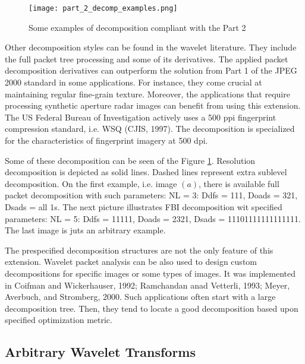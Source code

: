 \begin{figure}
    \centering
    \texttt{[image: part\_2\_decomp\_examples.png]}
    \caption{Some examples of decomposition compliant with the Part 2 \cite{jpeg_suite}}
    \label{fig:part_2_decomp_examples}
\end{figure}

Other decomposition styles can be found in the wavelet literature. They include the full packet
tree processing and some of its derivatives. The applied packet decomposition derivatives
can outperform the solution from Part 1 of the JPEG 2000 standard in some applications.
For instance, they come crucial at maintaining regular fine-grain texture. Moreover,
the applications that require processing synthetic aperture radar images can benefit
from using this extension. The US Federal Bureau of Investigation actively uses a 500 ppi
fingerprint compression standard, i.e. WSQ (CJIS, 1997). The decomposition is specialized
for the characteristics of fingerprint imagery at 500 dpi. \cite{jpeg_suite}

Some of these decomposition can be seen of the Figure \ref{fig:part_2_decomp_examples}.
Resolution decomposition is depicted as solid lines. Dashed lines represent extra sublevel
decomposition. On the first example, i.e. image $(a)$, there is available full packet decomposition
with such parameters: NL = 3: Ddfs = 111, Doads = 321, Dsads = all 1s. The next picture
illustrates FBI decomposition wit specified parameters: NL = 5: Ddfs = 11111, Doads = 2321,
Dsads = 11101111111111111. The last image is juts an arbitrary example. \cite{jpeg_suite}

The prespecified decomposition structures are not the only feature of this extension.
Wavelet packet analysis can be also used to design custom decompositions for specific images
or some types of images. It was implemented in Coifman and Wickerhauser, 1992; Ramchandan
anad Vetterli, 1993; Meyer, Averbuch, and Stromberg, 2000. Such applications often start with
a large decomposition tree. Then, they tend to locate a good decomposition based upon
specified optimization metric. \cite{jpeg_suite}

\subsection{Arbitrary Wavelet Transforms}

